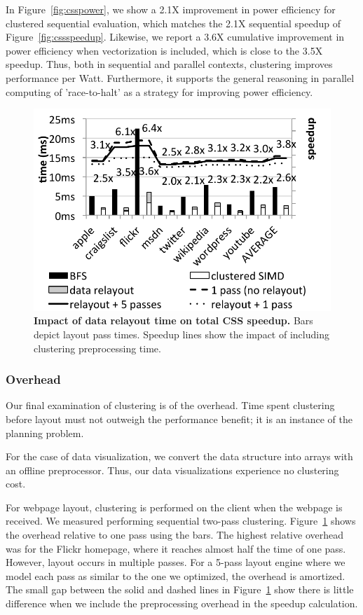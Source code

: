 In Figure~\ref{fig:csspower}, we show a 2.1X improvement in power efficiency for clustered sequential evaluation, which matches the 2.1X sequential speedup of Figure~\ref{fig:cssspeedup}. Likewise, we report a 3.6X cumulative improvement in power efficiency when vectorization is included, which is close to the 3.5X speedup. Thus, both in sequential and parallel contexts, clustering improves performance per Watt. Furthermore, it supports the general reasoning in parallel computing of 'race-to-halt' as a strategy for improving power efficiency.


\begin{figure}
\centering
\includegraphics[trim=0 0 0 0,clip,width=0.6\columnwidth]{chapter6/datarelayouttime3}
\caption{\textbf{Impact of data relayout time on total CSS speedup.} Bars depict layout pass times. Speedup lines show the impact of including clustering preprocessing time.}
\label{fig:cssrelayout}
\end{figure}



\subsubsection{Overhead}
Our final examination of clustering is of the overhead. Time spent clustering before layout must not outweigh the performance benefit; it is an instance of the planning problem. 

For the case of data visualization, we convert the data structure into arrays with an offline preprocessor. Thus, our data visualizations experience no clustering cost.

For webpage layout, clustering is performed on the client when the webpage is received. We measured performing sequential two-pass clustering. Figure~\ref{fig:cssrelayout} shows the overhead relative to one pass using the bars. The highest relative overhead was for the Flickr homepage, where it reaches almost half the time of one pass. However, layout occurs in multiple passes. For a 5-pass layout engine where we model each pass as similar to the one we optimized, the overhead is amortized. The small gap between the solid and dashed lines in Figure~\ref{fig:cssrelayout} show there is little difference when we include the preprocessing overhead in the speedup calculation.

